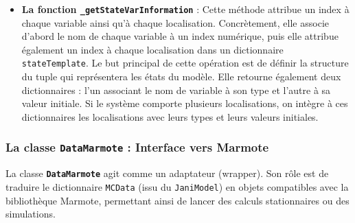 \documentclass[14pt, a4paper]{extarticle}
\begin{document}
\begin{itemize}
En fin d'exécution, la méthode restitue quatre structures de données. Elle fournit premièrement un dictionnaire associant les objets états à leur représentation immuable(tuple). Elle retourne deuxièmement l'ensemble des états absorbants identifiés durant le parcours. Elle produit troisièmement un dictionnaire reliant les triplets d'état source, d'état de destination et d'action à leurs probabilités et récompenses respectives. Elle livre finalement un dictionnaire qui attribue un index numérique unique à chaque action recensée au sein du modèle.
\item \textbf{La fonction \texttt{\_getStateVarInformation}} : Cette méthode attribue un index à chaque variable ainsi qu'à chaque localisation. Concrètement, elle associe d'abord le nom de chaque variable à un index numérique, puis elle attribue également un index à chaque localisation dans un dictionnaire \texttt{stateTemplate}. Le but principal de cette opération est de définir la structure du tuple qui représentera les états du modèle. Elle retourne également deux dictionnaires : l'un associant le nom de variable à son type et l'autre à sa valeur initiale. Si le système comporte plusieurs localisations, on intègre à ces dictionnaires les localisations avec leurs types et leurs valeurs initiales.
\end{itemize}

\subsubsection{La classe \texttt{DataMarmote} : Interface vers Marmote}

La classe \textbf{\texttt{DataMarmote}} agit comme un adaptateur (wrapper). Son rôle est de traduire le dictionnaire \texttt{MCData} (issu du \texttt{JaniModel}) en objets compatibles avec la bibliothèque Marmote, permettant ainsi de lancer des calculs stationnaires ou des simulations.
\end{document}
